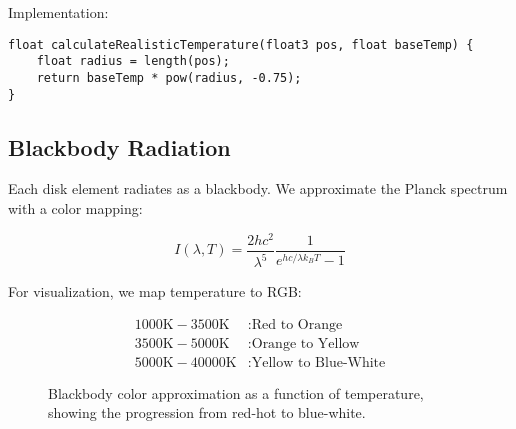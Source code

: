 \documentclass[12pt,a4paper]{article}
\theoremstyle{definition}
\theoremstyle{remark}
\begin{document}
Implementation:

\begin{lstlisting}[style=metalstyle, caption=Temperature calculation]
float calculateRealisticTemperature(float3 pos, float baseTemp) {
    float radius = length(pos);
    return baseTemp * pow(radius, -0.75);
}
\end{lstlisting}

\subsection{Blackbody Radiation}

Each disk element radiates as a blackbody. We approximate the Planck spectrum with a color mapping:

\begin{equation}
    I(\lambda, T) = \frac{2hc^2}{\lambda^5}\frac{1}{e^{hc/\lambda k_B T} - 1}
\end{equation}

For visualization, we map temperature to RGB:

\begin{align}
    1000\text{K} - 3500\text{K} &: \text{Red to Orange} \\
    3500\text{K} - 5000\text{K} &: \text{Orange to Yellow} \\
    5000\text{K} - 40000\text{K} &: \text{Yellow to Blue-White}
\end{align}

\begin{figure}[H]
    \centering
    \caption{Blackbody color approximation as a function of temperature, showing the progression from red-hot to blue-white.}
    \label{fig:blackbody_colors}
\end{figure}
\end{document}
